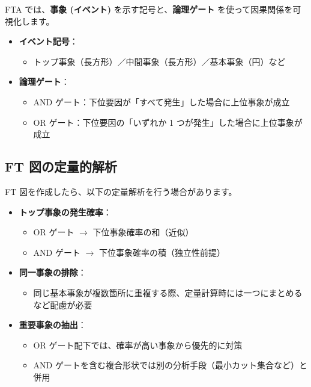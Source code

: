 FTA では、\textbf{事象 (イベント)} を示す記号と、\textbf{論理ゲート} を使って因果関係を可視化します。

\begin{itemize}
 \item \textbf{イベント記号}：
   \begin{itemize}
    \item トップ事象（長方形）／中間事象（長方形）／基本事象（円）など
   \end{itemize}
 \item \textbf{論理ゲート}：
   \begin{itemize}
    \item AND ゲート：下位要因が「すべて発生」した場合に上位事象が成立
    \item OR ゲート：下位要因の「いずれか 1 つが発生」した場合に上位事象が成立
   \end{itemize}
\end{itemize}

\subsection{FT 図の定量的解析}

FT 図を作成したら、以下の定量解析を行う場合があります。

\begin{itemize}
 \item \textbf{トップ事象の発生確率}：
   \begin{itemize}
    \item OR ゲート $\to$ 下位事象確率の和（近似）
    \item AND ゲート $\to$ 下位事象確率の積（独立性前提）
   \end{itemize}

 \item \textbf{同一事象の排除}：
   \begin{itemize}
    \item 同じ基本事象が複数箇所に重複する際、定量計算時には一つにまとめるなど配慮が必要
   \end{itemize}

 \item \textbf{重要事象の抽出}：
   \begin{itemize}
    \item OR ゲート配下では、確率が高い事象から優先的に対策
    \item AND ゲートを含む複合形状では別の分析手段（最小カット集合など）と併用
   \end{itemize}
\end{itemize}

